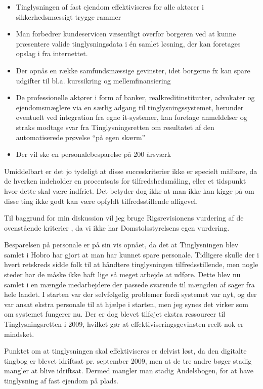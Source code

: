 \documentclass[10pt,a4paper,danish]{article}
\begin{document}
\begin{itemize}
\item Tinglysningen af fast ejendom effektiviseres for alle aktører i sikkerhedsmæssigt trygge rammer
\item Man forbedrer kundeservicen væsentligt overfor borgeren ved at kunne præsentere valide tinglysningsdata i én samlet løsning, der kan foretages opslag i fra internettet.
\item Der opnås en række samfundsmæssige gevinster, idet borgerne fx kan spare udgifter til bl.a. kurssikring og mellemfinansiering
\item De professionelle aktører i form af banker, realkreditinstitutter, advokater og ejendomsmæglere via en særlig adgang til tinglysningssystemet, herunder eventuelt ved integration fra egne it-systemer, kan foretage anmeldelser og straks modtage svar fra Tinglysningsretten om resultatet af den automatiserede prøvelse "`på egen skærm"' 
\item Der vil ske en personalebesparelse på 200 årsværk
\end{itemize}

Umiddelbart er det jo tydeligt at disse succeskriterier ikke er specielt målbare, da de hverken indeholder en procentsats for tilfredshedsmåling, eller et tidspunkt hvor dette skal være indfriet. Det betyder dog ikke at man ikke kan kigge på om disse ting ikke godt kan være opfyldt tilfredsstillende alligevel.

Til baggrund for min diskussion vil jeg bruge Rigsrevisionens vurdering af de ovenstående kriterier \cite[~s. 34]{Rigs}, da vi ikke har Domstolsstyrelsens egen vurdering.

Besparelsen på personale er på sin vis opnået, da det at Tinglysningen blev samlet i Hobro har gjort at man har kunnet spare personale. Tidligere skulle der i hvert retskreds sidde folk til at håndtere tinglysningen tilfredsstillende, men nogle steder har de måske ikke haft lige så meget arbejde at udføre. Dette blev nu samlet i en mængde medarbejdere der passede svarende til mængden af sager fra hele landet. I starten var der selvfølgelig problemer fordi systemet var nyt, og der var ansat ekstra personale til at hjælpe i starten, men jeg synes det virker som om systemet fungerer nu. Der er dog blevet tilføjet ekstra ressourcer til Tinglysningsretten i 2009, hvilket gør at effektiviseringsgevinsten reelt nok er mindsket.

Punktet om at tinglysningen skal effektiviseres er delvist løst, da den digitalte tingbog er blevet idriftsat pr. september 2009, men at de tre andre bøger stadig mangler at blive idriftsat. Dermed mangler man stadig Andelsbogen, for at have tinglysning af fast ejendom på plads.
\end{document}
